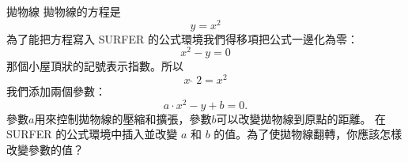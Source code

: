 \begin{surferPage}{拋物線}
拋物線的方程是 \[y=x^2\]
為了能把方程寫入 SURFER 的公式環境我們得移項把公式一邊化為零：
\[x^2-y=0\]
那個小屋頂狀的記號表示指數。所以
\[ x  \,\hat{\ } \, 2 =x^2\]
我們添加兩個參數：
\[a \cdot x^2-y+b=0.\]
參數$a$用來控制拋物線的壓縮和擴張，參數$b$可以改變拋物線到原點的距離。
\newline
在 SURFER 的公式環境中插入並改變 $a$ 和 $b$ 的值。為了使拋物線翻轉，你應該怎樣改變參數的值？
\end{surferPage}

